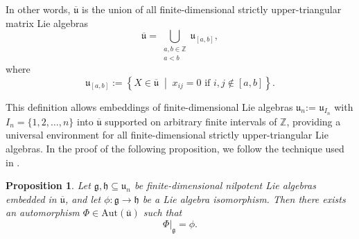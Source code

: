 \documentclass[12pt]{amsart}
\newtheorem{prop}[thm]{Proposition}
\theoremstyle{definition}
\begin{document}
In other words, \( \overline {\mathfrak{u}} \) is the union of all finite-dimensional strictly upper-triangular matrix Lie algebras
\[\overline{\mathfrak{u}} = \bigcup_{\substack{a,b \in \mathbb{Z} \\ a < b}} \mathfrak{u}_{[a,b]},
\]
where
\[
\mathfrak{u}_{[a,b]} := \left\{ X \in \overline{\mathfrak{u}} \; \middle| \; x_{ij} = 0 \text{ if } i,j \notin [a,b] \right\}.
\]

This definition allows embeddings of finite-dimensional Lie algebras \( \mathfrak{u}_n \):=  \( \mathfrak{u}_{I_n}\) with \(I_n = \{1, 2, \dots , n\} \) into \( \overline{\mathfrak{u}} \) supported on arbitrary finite intervals of \( \mathbb{Z} \), providing a universal environment for all finite-dimensional strictly upper-triangular Lie algebras. In the proof of the following proposition, we follow the technique used in \cite{Be}.

 \medskip 
 
  \begin{prop}\label{prop:extension}  Let  \( \mathfrak{g}, \mathfrak{h} \subseteq \mathfrak{u}_n \) be finite-dimensional nilpotent Lie algebras embedded in \(\overline{ \mathfrak{u}} \), and let \( \phi : \mathfrak{g} \to \mathfrak{h} \) be a Lie algebra isomorphism. Then there exists an automorphism \( \Phi \in \mathrm{Aut}(\overline{\mathfrak{u}}) \) such that
\[
\Phi|_{\mathfrak{g}} = \phi.
\]
\end{prop}
\end{document}
